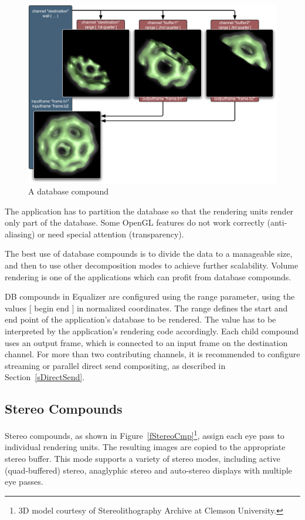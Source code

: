 \documentclass[10pt,a4]{scrartcl}
\newcommand{\fig}[1]{Figure~\ref{#1}}
\newcommand{\sref}[1]{Section~\ref{#1}}
\begin{document}
\begin{figure}
  \includegraphics[width=.618\textwidth]{images/DB.pdf}
  {\caption{\label{fDB}\small A database compound}}
\end{figure}
The application has to partition the database so that the rendering units
render only part of the database. Some OpenGL features do not work
correctly (anti-aliasing) or need special attention (transparency).

The best use of database compounds is to divide the data to a manageable
size, and then to use other decomposition modes to achieve further
scalability. Volume rendering is one of the applications which can
profit from database compounds.

DB compounds in Equalizer are configured using the \textsf{range}
parameter, using the values \textsf{[ begin end ]} in normalized
coordinates. The range defines the start and end point of the
application's database to be rendered. The value has to be interpreted
by the application's rendering code accordingly.  Each child compound
uses an output frame, which is connected to an input frame on the
destination channel. For more than two contributing channels, it is
recommended to configure streaming or parallel direct send compositing,
as described in \sref{sDirectSend}.


\subsection{Stereo Compounds}

Stereo compounds, as shown in \fig{fStereoCmp}\footnote{3D model
  courtesy of Stereolithography Archive at Clemson University.}, assign
each eye pass to individual rendering units. The resulting images are
copied to the appropriate stereo buffer. This mode supports a variety of
stereo modes, including active (quad-buffered) stereo, anaglyphic stereo
and auto-stereo displays with multiple eye passes.
\end{document}
